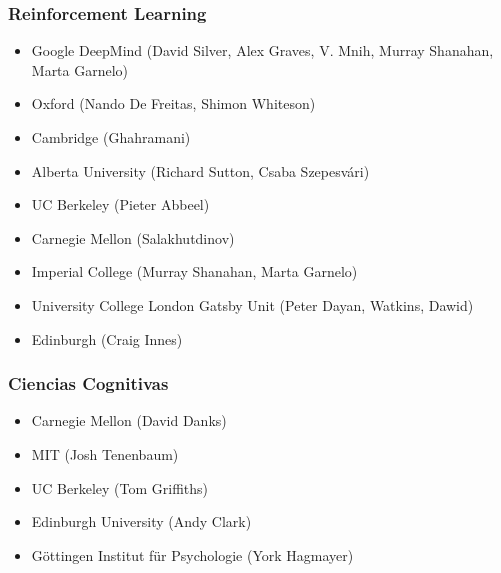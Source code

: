 \documentclass[11pt]{article}
\theoremstyle{plain}
\begin{document}
\subsubsection{Reinforcement Learning}
\begin{itemize}
\item Google DeepMind (David Silver, Alex Graves, V. Mnih, Murray Shanahan, Marta Garnelo)
\item Oxford (Nando De Freitas, Shimon Whiteson)
\item Cambridge (Ghahramani)
\item  Alberta University (Richard Sutton, Csaba Szepesvári)
\item UC Berkeley (Pieter Abbeel)
\item Carnegie Mellon (Salakhutdinov)
\item Imperial College (Murray Shanahan, Marta Garnelo)
\item University College London Gatsby Unit (Peter Dayan, Watkins, Dawid)
\item Edinburgh (Craig Innes)
\end{itemize}
\subsubsection{Ciencias Cognitivas}
\begin{itemize}
\item Carnegie Mellon (David Danks)
\item MIT (Josh Tenenbaum)
\item UC Berkeley (Tom Griffiths)
\item Edinburgh University (Andy Clark)
\item Göttingen Institut für Psychologie (York Hagmayer)
\end{itemize}
\newpage


\end{document}
